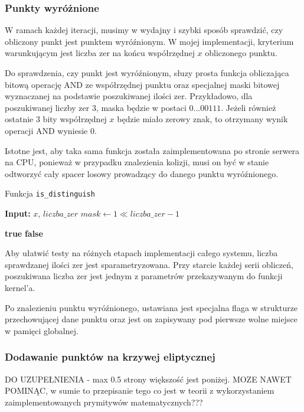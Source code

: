 \subsubsection{Punkty wyróżnione}
W ramach każdej iteracji, musimy w wydajny i szybki sposób sprawdzić, czy obliczony punkt jest punktem wyróźnionym.
W mojej implementacji, kryterium warunkującym jest liczba zer na końcu współrzędnej $x$ obliczonego punktu.
\par
Do sprawdzenia, czy punkt jest wyróźnionym, słuzy prosta funkcja obliczająca bitową operację AND ze
współrzędnej punktu oraz specjalnej maski bitowej wyznaczanej na podstawie poszukiwanej ilości zer.
Przykładowo, dla poszukiwanej liczby zer 3, maska będzie w postaci $0 ... 00111$. Jeżeli
również ostatnie 3 bity współrzędnej $x$ będzie miało zerowy znak, to otrzymany wynik operacji AND wyniesie 0.
\par
Istotne jest, aby taka sama funkcja została zaimplementowana po stronie serwera na CPU, ponieważ w przypadku znalezienia kolizji,
musi on być w stanie odtworzyć cały spacer losowy prowadzący do danego punktu wyróźnionego.

\begin{algorithm}
    \caption{Funkcja \texttt{is\_distinguish}}
    \begin{algorithmic}[1]
        \State \textbf{Input:} $x$, $liczba\_zer$
        \State $mask \gets 1 \ll liczba\_zer - 1$

        \State \Return \textbf{true}
        \Else
        \State \Return \textbf{false}
        \EndIf
    \end{algorithmic}
\end{algorithm}

\par
Aby ułatwić testy na różnych etapach implementacji całego systemu,
liczba sprawdzanej ilości zer jest sparametryzowana. Przy starcie każdej serii obliczeń, poszukiwana liczba zer jest jednym z parametrów przekazywanym
do funkcji kernel'a.
\par
Po znalezieniu punktu wyróźnionego, ustawiana jest specjalna flaga w strukturze przechowującej dane punktu oraz
jest on zapisywany pod pierwsze wolne miejsce w pamięci globalnej.

\subsubsection{Dodawanie punktów na krzywej eliptycznej}
DO UZUPEŁNIENIA - max 0.5 strony większość jest poniżej.
MOZE NAWET POMINĄC, w sumie to przepisanie tego co jest w teorii z wykorzystaniem zaimplementowanych prymitywów matematycznych???
